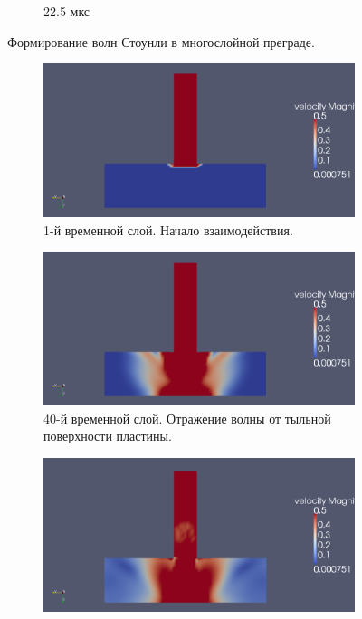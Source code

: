 \begin{figure}[ht]
\begin{subfigure}[b]{\textwidth}
\caption{22.5 мкс}
\end{subfigure}
\caption{Формирование волн Стоунли в многослойной преграде.}
\label{pic:stounly_wave}
\end{figure}

\clearpage
\newpage


\begin{figure}[ht]
\begin{subfigure}[b]{0.5\textwidth}
\centering
\includegraphics[width=\textwidth]{png/strike-test/both-2d/0001.png}
\caption{1-й временной слой. Начало взаимодействия.}
\end{subfigure}
\begin{subfigure}[b]{0.5\textwidth}
\centering
\includegraphics[width=\textwidth]{png/strike-test/both-2d/0040.png}
\caption{40-й временной слой. Отражение волны от тыльной поверхности пластины.}
\end{subfigure}
\begin{subfigure}[b]{0.5\textwidth}
\centering
\includegraphics[width=\textwidth]{png/strike-test/both-2d/0120.png}

\end{subfigure}
\end{figure}
